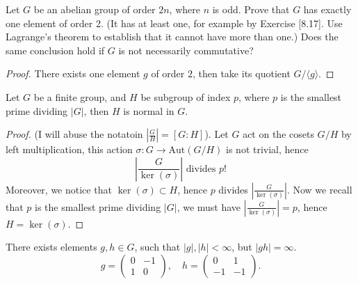 \documentclass[openany]{book}
\newcommand{\la}{\langle}
\newcommand{\ra}{\rangle}
\begin{document}
\begin{prob}[8.18]
    Let \( G \) be an abelian group of order \( 2n \), where \( n \) is odd. Prove that \( G \) has exactly one element of order 2. (It has at least one, for example by Exercise [8.17]. Use Lagrange's theorem to establish that it cannot have more than one.) Does the same conclusion hold if \( G \) is not necessarily commutative?
\end{prob}
\begin{proof}
    There exists one element $g$ of order $2$, then take its quotient $G/\la g\ra$. 
\end{proof}

\begin{prob}[9.11]
    Let $G$ be a finite group, and $H$ be subgroup of index $p$, where $p$ is the smallest prime dividing $|G|$, then $H$ is normal in $G$.
\end{prob}
\begin{proof}
    (I will abuse the notatoin $\left|\frac{G}{H}\right|=[G:H]$).
    Let $G$ act on the cosets $G/H$ by left multiplication, this action $\sigma: G\to\text{Aut}(G/H)$ is not trivial, hence 
    \begin{equation*}
        \left|\frac{G}{\ker(\sigma)}\right|\text{ divides } p!
    \end{equation*}
    Moreover, we notice that $\ker(\sigma)\subset H$, hence $p$ divides $\left|\frac{G}{\ker(\sigma)}\right|$. Now we recall that $p$ is the smallest prime dividing $|G|$, we must have $\left|\frac{G}{\ker(\sigma)}\right|=p$, hence $H=\ker(\sigma)$.
\end{proof}






















\begin{prop}[1.12]
    There exists elements $g,h\in G$, such that $|g|,|h|<\infty$, but $|gh|=\infty$.
    \[
    g = \begin{pmatrix}
    0 & -1 \\
    1 & 0
    \end{pmatrix}, \quad h = \begin{pmatrix}
    0 & 1 \\
    -1 & -1
    \end{pmatrix}.
    \]
\end{prop}
\end{document}

